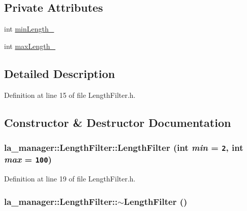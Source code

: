 \subsection*{Private Attributes}
\begin{CompactItemize}
\item 
int \hyperlink{classla__manager_1_1LengthFilter_e780693a4bf6ef4d416b9cbe500d8e3b}{minLength\_\-}
\item 
int \hyperlink{classla__manager_1_1LengthFilter_1084f2cadc0a1ddf0143e52adc56200a}{maxLength\_\-}
\end{CompactItemize}


\subsection{Detailed Description}


Definition at line 15 of file LengthFilter.h.

\subsection{Constructor \& Destructor Documentation}
\hypertarget{classla__manager_1_1LengthFilter_eec14982208a4aba759f923bb65fc6e9}{
\subsubsection[{LengthFilter}]{\setlength{\rightskip}{0pt plus 5cm}la\_\-manager::LengthFilter::LengthFilter (int {\em min} = {\tt 2}, \/  int {\em max} = {\tt 100})}}
\label{classla__manager_1_1LengthFilter_eec14982208a4aba759f923bb65fc6e9}




Definition at line 19 of file LengthFilter.h.\hypertarget{classla__manager_1_1LengthFilter_3afc736224fe2ae9025ae1153eac6b51}{
\subsubsection[{$\sim$LengthFilter}]{\setlength{\rightskip}{0pt plus 5cm}la\_\-manager::LengthFilter::$\sim$LengthFilter ()}}
\label{classla__manager_1_1LengthFilter_3afc736224fe2ae9025ae1153eac6b51}




